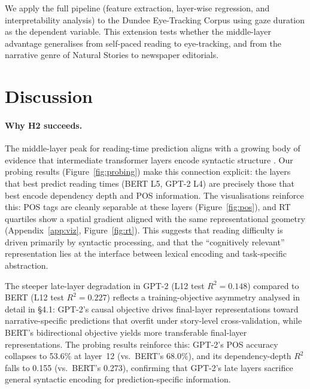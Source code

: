 \documentclass[11pt]{article}
\begin{document}
We apply the full pipeline (feature extraction, layer-wise regression, and interpretability analysis) to the Dundee Eye-Tracking Corpus \citep{kennedy2003} using gaze duration as the dependent variable.
This extension tests whether the middle-layer advantage generalises from self-paced reading to eye-tracking, and from the narrative genre of Natural Stories to newspaper editorials.

\section{Discussion}

\paragraph{Why H2 succeeds.}
The middle-layer peak for reading-time prediction aligns with a growing body of evidence that intermediate transformer layers encode syntactic structure \citep{jawahar2019}.
Our probing results (Figure~\ref{fig:probing}) make this connection explicit: the layers that best predict reading times (BERT L5, GPT-2 L4) are precisely those that best encode dependency depth and POS information.
The visualisations reinforce this: POS tags are cleanly separable at these layers (Figure~\ref{fig:pos}), and RT quartiles show a spatial gradient aligned with the same representational geometry (Appendix~\ref{app:viz}, Figure~\ref{fig:rt}).
This suggests that reading difficulty is driven primarily by syntactic processing, and that the ``cognitively relevant'' representation lies at the interface between lexical encoding and task-specific abstraction.

The steeper late-layer degradation in GPT-2 (L12 test $R^2 = 0.148$) compared to BERT (L12 test $R^2 = 0.227$) reflects a training-objective asymmetry analysed in detail in \S4.1: GPT-2's causal objective drives final-layer representations toward narrative-specific predictions that overfit under story-level cross-validation, while BERT's bidirectional objective yields more transferable final-layer representations.
The probing results reinforce this: GPT-2's POS accuracy collapses to 53.6\% at layer~12 (vs.\ BERT's 68.0\%), and its dependency-depth $R^2$ falls to 0.155 (vs.\ BERT's 0.273), confirming that GPT-2's late layers sacrifice general syntactic encoding for prediction-specific information.
\end{document}
